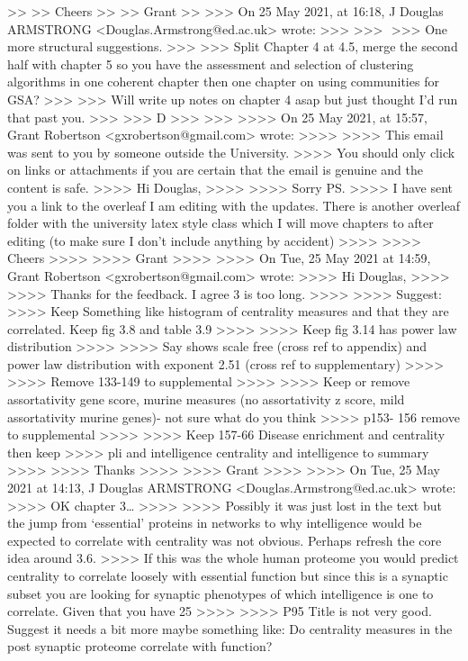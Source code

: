 >>
>> Cheers
>>
>> Grant
>>
>>> On 25 May 2021, at 16:18, J Douglas ARMSTRONG <Douglas.Armstrong@ed.ac.uk> wrote:
>>>
>>> ﻿
>>> One more structural suggestions.
>>>
>>> Split Chapter 4 at 4.5, merge the second half with chapter 5 so you have the assessment and selection of clustering algorithms in one coherent chapter then one chapter on using communities for GSA?
>>>
>>> Will write up notes on chapter 4 asap but just thought I’d run that past you.
>>>
>>> D
>>>
>>>
>>>> On 25 May 2021, at 15:57, Grant Robertson <gxrobertson@gmail.com> wrote:
>>>>
>>>> This email was sent to you by someone outside the University.
>>>> You should only click on links or attachments if you are certain that the email is genuine and the content is safe.
>>>> Hi Douglas,
>>>>
>>>> Sorry PS.
>>>> I have sent you a link to the overleaf I am editing with the updates. There is another overleaf folder with the university latex style class which I will move chapters to after editing (to make sure I don't include anything by accident)
>>>>
>>>> Cheers
>>>>
>>>> Grant
>>>>
>>>> On Tue, 25 May 2021 at 14:59, Grant Robertson <gxrobertson@gmail.com> wrote:
>>>> Hi Douglas,
>>>>
>>>> Thanks for the feedback. I agree 3 is too long.
>>>>
>>>> Suggest:
>>>> Keep Something like histogram of centrality measures and that they are correlated. Keep fig 3.8 and table 3.9
>>>>
>>>> Keep fig 3.14 has power law distribution
>>>>
>>>> Say shows scale free (cross ref to appendix) and power law distribution with exponent 2.51 (cross ref to supplementary)
>>>>
>>>> Remove 133-149 to supplemental
>>>>
>>>> Keep or remove assortativity gene score, murine measures  (no assortativity z score, mild assortativity murine genes)- not sure what do you think
>>>> p153- 156 remove to supplemental
>>>>
>>>> Keep 157-66 Disease enrichment and centrality then keep
>>>> pli and intelligence centrality and intelligence to summary
>>>>
>>>> Thanks
>>>>
>>>> Grant
>>>>
>>>> On Tue, 25 May 2021 at 14:13, J Douglas ARMSTRONG <Douglas.Armstrong@ed.ac.uk> wrote:
>>>> OK chapter 3…
>>>>
>>>> Possibly it was just lost in the text but the jump from ‘essential’ proteins in networks to why intelligence would be expected to correlate with centrality was not obvious. Perhaps refresh the core idea around 3.6.
>>>> If this was the whole human proteome you would predict centrality to correlate loosely with essential function but since this is a synaptic subset you are looking for synaptic phenotypes of which intelligence is one to correlate. Given that you have 25%
>>>>
>>>> P95 Title is not very good. Suggest it needs a bit more maybe something like: Do centrality measures in the post synaptic proteome correlate with function?
